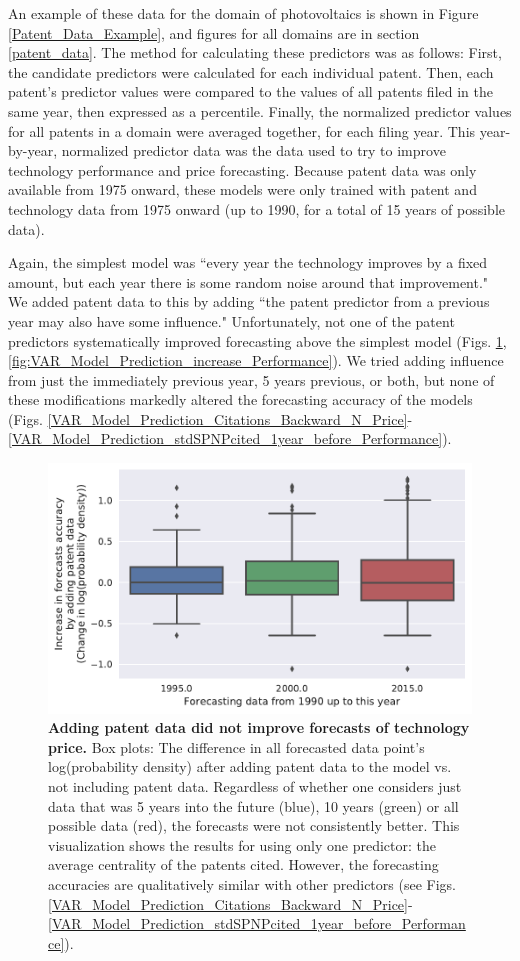 \documentclass{article}
\begin{document}
An example of these data for the domain of photovoltaics is shown in Figure \ref{Patent_Data_Example}, and figures for all domains are in section \ref{patent_data}. The method for calculating these predictors was as follows: First, the candidate predictors were calculated for each individual patent. Then, each patent's predictor values were compared to the values of all patents filed in the same year, then expressed as a percentile. Finally, the normalized predictor values for all patents in a domain were averaged together, for each filing year. This year-by-year, normalized predictor data  was the data used to try to improve technology performance and price forecasting. Because patent data was only available from 1975 onward, these models were only trained with patent and technology data from 1975 onward (up to 1990, for a total of 15 years of possible data).

Again, the simplest model was ``every year the technology improves by a fixed amount, but each year there is some random noise around that improvement." We added patent data to this by adding ``the patent predictor from a previous year may also have some influence." Unfortunately, not one of the patent predictors systematically improved forecasting above the simplest model (Figs. \ref{fig:VAR_Model_Prediction_increase_Price}, \ref{fig:VAR_Model_Prediction_increase_Performance}).  We tried adding influence from just the immediately previous year, 5 years previous, or both, but none of these modifications markedly altered the forecasting accuracy of the models (Figs. \ref{VAR_Model_Prediction_Citations_Backward_N_Price}-\ref{VAR_Model_Prediction_stdSPNPcited_1year_before_Performance}).

\begin{figure}
    \centering
    \includegraphics[width=.75\textwidth]{figs/VAR_Model_Prediction_increase_Price.pdf}
    \caption{\textbf{Adding patent data did not improve forecasts of technology price.} Box plots: The difference in all forecasted data point's log(probability density) after adding patent data to the model vs. not including patent data. Regardless of whether one considers just data that was 5 years into the future (blue), 10 years (green) or all possible data (red), the forecasts were not consistently better. This visualization shows the results for using only one predictor: the average centrality of the patents cited. However, the forecasting accuracies are qualitatively similar with other predictors (see Figs. \ref{VAR_Model_Prediction_Citations_Backward_N_Price}-\ref{VAR_Model_Prediction_stdSPNPcited_1year_before_Performance}).}
    \label{fig:VAR_Model_Prediction_increase_Price}
\end{figure}
\end{document}
